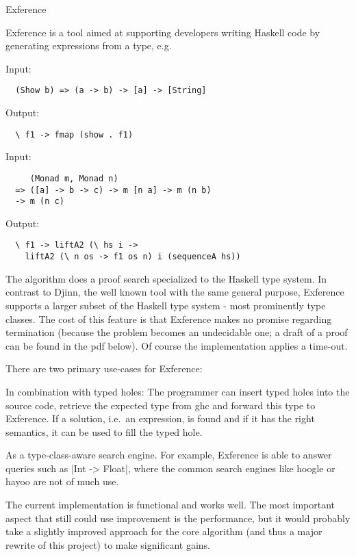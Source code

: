 \begin{hcarentry}{Exference}
\makeheader

Exference is a tool aimed at supporting developers writing Haskell code by
generating expressions from a type, e.g.\\
{\small
Input:
%
\begin{verbatim}
  (Show b) => (a -> b) -> [a] -> [String]
\end{verbatim}
%
Output:
%
\begin{verbatim}
  \ f1 -> fmap (show . f1)
\end{verbatim}
%
Input:
%
\begin{verbatim}
     (Monad m, Monad n)
  => ([a] -> b -> c) -> m [n a] -> m (n b)
  -> m (n c)
\end{verbatim}
%
Output:
%
\begin{verbatim}
  \ f1 -> liftA2 (\ hs i ->
    liftA2 (\ n os -> f1 os n) i (sequenceA hs))
\end{verbatim}
}

The algorithm does a proof search specialized to the Haskell type system.
In contrast to Djinn, the well known tool with the same general purpose,
Exference supports a larger subset of the Haskell type system - most
prominently type classes. The cost of this feature is that Exference makes
no promise regarding termination (because the problem becomes an undecidable
one; a draft of a proof can be found in the pdf below). Of course the
implementation applies a time-out.

There are two primary use-cases for Exference:

\begin{compactitem}
\item
  In combination with typed holes: The programmer can insert typed holes
  into the source code, retrieve the expected type from ghc and forward
  this type to Exference. If a solution, i.e.~an expression, is found
  and if it has the right semantics, it can be used to fill the typed
  hole.
\item
  As a type-class-aware search engine. For example, Exference is able to
  answer queries such as |Int -> Float|, where the common search engines like
  hoogle or hayoo are not of much use.
\end{compactitem}

The current implementation is functional and works well. The most
important aspect that still could use improvement is the performance, but it
would probably take a slightly improved approach for the core algorithm (and
thus a major rewrite of this project) to make significant gains.


\end{hcarentry}
